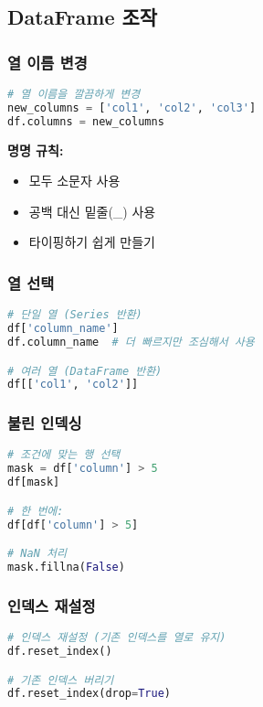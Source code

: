 \documentclass[12pt,a4paper]{article}
\begin{document}
\subsection{DataFrame 조작}

\subsubsection{열 이름 변경}

\begin{lstlisting}[language=Python]
# 열 이름을 깔끔하게 변경
new_columns = ['col1', 'col2', 'col3']
df.columns = new_columns
\end{lstlisting}

\textbf{명명 규칙:}
\begin{itemize}
    \item 모두 소문자 사용
    \item 공백 대신 밑줄(\_) 사용
    \item 타이핑하기 쉽게 만들기
\end{itemize}

\subsubsection{열 선택}

\begin{lstlisting}[language=Python]
# 단일 열 (Series 반환)
df['column_name']
df.column_name  # 더 빠르지만 조심해서 사용

# 여러 열 (DataFrame 반환)
df[['col1', 'col2']]
\end{lstlisting}

\subsubsection{불린 인덱싱}

\begin{lstlisting}[language=Python]
# 조건에 맞는 행 선택
mask = df['column'] > 5
df[mask]

# 한 번에:
df[df['column'] > 5]

# NaN 처리
mask.fillna(False)
\end{lstlisting}

\subsubsection{인덱스 재설정}

\begin{lstlisting}[language=Python]
# 인덱스 재설정 (기존 인덱스를 열로 유지)
df.reset_index()

# 기존 인덱스 버리기
df.reset_index(drop=True)
\end{lstlisting}
\end{document}
